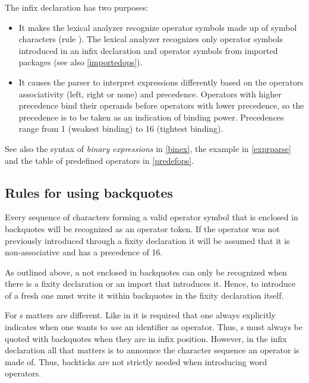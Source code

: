The infix declaration has two purposes:

\begin{itemize}
\item It makes the lexical analyzer recognize operator symbols made up of symbol characters (rule ). The lexical analyzer recognizes only operator symbols introduced in an infix declaration and operator symbols from imported packages (see also \autoref{importedops}).

\item It causes the parser to interpret expressions differently based on the operators associativity (left, right or none) and precedence.
Operators with higher precedence bind their operands before operators with lower precedence, so the precedence is to be taken as an indication of binding power.
Precedences range from 1 (weakest binding) to 16 (tightest binding).

\end{itemize}

See also the syntax of \emph{binary expressions} in \autoref{binex}, the example in \autoref{exprparse} and the table of predefined operators in \autoref{predefops}.

\subsection{Rules for using backquotes}

Every sequence of characters forming a valid operator symbol that is enclosed in backquotes will be recognized as an operator token. If the operator was not previously introduced through a fixity declaration it will be assumed that it is non-associative and has a precedence of 16.

As outlined above, a  not enclosed in backquotes can only be recognized when there is a fixity declaration or an import that introduces it. Hence, to introduce of a fresh  one must write it within backquotes in the fixity declaration itself.

For s matters are different. Like in \haskell{} it is required that one always explicitly indicates when one wants to \textit{use} an identifier as operator. Thus, s must always be quoted with backquotes when they are in infix position. However, in the infix declaration all that matters is to announce the character sequence an operator is made of. Thus, backticks are not strictly needed when introducing word operators.

